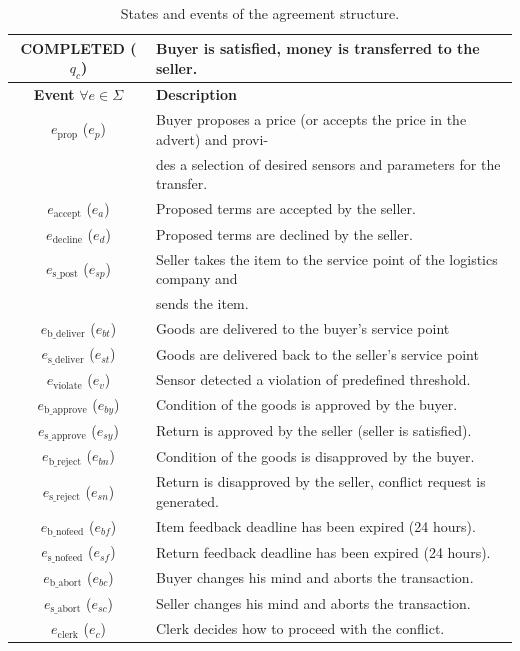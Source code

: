 \begin{table}[H]
\begin{tabular}{| c | l |}
{\tiny COMPLETED} ($q_{c}$)& Buyer is satisfied, money is transferred to the seller. \\
\hline
\textbf{Event} $\forall e \in \Sigma$ & \textbf{Description}\\
\hline
$e_{\mathrm{prop}}$ ($e_{p}$)& Buyer proposes a price (or accepts the price in the advert) and provi- \\ & des a selection of desired sensors and parameters for the transfer.\\
$e_{\mathrm{accept}}$ ($e_{a}$)& Proposed terms are accepted by the seller.\\
$e_{\mathrm{decline}}$ ($e_{d}$)& Proposed terms are declined by the seller.\\
$e_{\mathrm{s\_post}}$ ($e_{sp}$)& Seller takes the item to the service point of the logistics company and \\ & sends the item.\\
$e_{\mathrm{b\_deliver}}$ ($e_{bt}$)& Goods are delivered to the buyer's service point\\
$e_{\mathrm{s\_deliver}}$ ($e_{st}$)& Goods are delivered back to the seller's service point\\
$e_{\mathrm{violate}}$ ($e_{v}$)& Sensor detected a violation of predefined threshold.\\
$e_{\mathrm{b\_approve}}$ ($e_{by}$)& Condition of the goods is approved by the buyer.\\
$e_{\mathrm{s\_approve}}$ ($e_{sy}$)& Return is approved by the seller (seller is satisfied).\\
$e_{\mathrm{b\_reject}}$ ($e_{bn}$)& Condition of the goods is disapproved by the buyer.\\
$e_{\mathrm{s\_reject}}$ ($e_{sn}$)& Return is disapproved by the seller, conflict request is generated.\\
$e_{\mathrm{b\_nofeed}}$ ($e_{bf}$)& Item feedback deadline has been expired (24 hours).\\
$e_{\mathrm{s\_nofeed}}$ ($e_{sf}$)& Return feedback deadline has been expired (24 hours).\\
$e_{\mathrm{b\_abort}}$ ($e_{bc}$)& Buyer changes his mind and aborts the transaction.\\
$e_{\mathrm{s\_abort}}$ ($e_{sc}$)& Seller changes his mind and aborts the transaction.\\
$e_{\mathrm{clerk}}$ ($e_{c}$)& Clerk decides how to proceed with the conflict. \\
\hline
\end{tabular}
\caption{States and events of the agreement structure.}
\label{tab:states}
\end{table}


